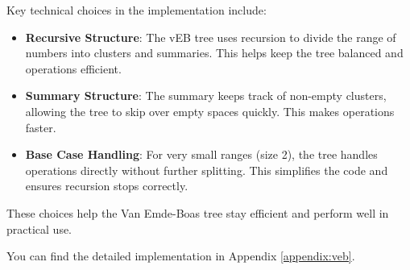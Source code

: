 Key technical choices in the implementation include:
\begin{itemize}
    \item \textbf{Recursive Structure}: The vEB tree uses recursion to divide the range of numbers into clusters and summaries. This helps keep the tree balanced and operations efficient.
    \item \textbf{Summary Structure}: The summary keeps track of non-empty clusters, allowing the tree to skip over empty spaces quickly. This makes operations faster.
    \item \textbf{Base Case Handling}: For very small ranges (size 2), the tree handles operations directly without further splitting. This simplifies the code and ensures recursion stops correctly.
\end{itemize}

These choices help the Van Emde-Boas tree stay efficient and perform well in practical use.

You can find the detailed implementation in Appendix \ref{appendix:veb}.

